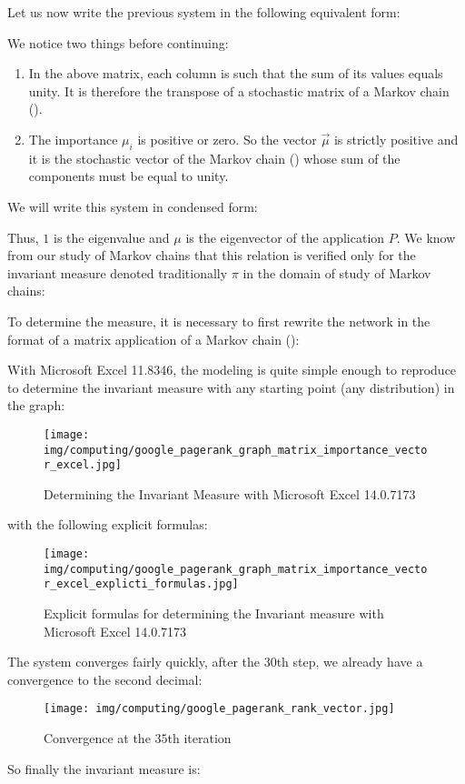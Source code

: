 	Let us now write the previous system in the following equivalent form:
	\setcounter{MaxMatrixCols}{20}
	
	We notice two things before continuing:
	\begin{enumerate}
		\item In the above matrix, each column is such that the sum of its values equals unity. It is therefore the transpose of a stochastic matrix of a Markov chain ().

		\item The importance $\mu_i$ is positive or zero. So the vector $\vec{\mu}$ is strictly positive and it is the stochastic vector of the Markov chain () whose sum of the components must be equal to unity.
	\end{enumerate}
	We will write this system in condensed form:
	
	Thus, $1$ is the eigenvalue and $\mu$ is the eigenvector of the application $P$. We know from our study of Markov chains that this relation is verified only for the invariant measure denoted traditionally $\pi$ in the domain of study of Markov chains:
	
	To determine the measure, it is necessary to first rewrite the network in the format of a matrix application of a Markov chain ():
	
	With Microsoft Excel 11.8346, the modeling is quite simple enough to reproduce to determine the invariant measure with any starting point (any distribution) in the graph:
	\begin{figure}[H]
		\centering
		\texttt{[image: img/computing/google\_pagerank\_graph\_matrix\_importance\_vector\_excel.jpg]}
		\caption[]{Determining the Invariant Measure with Microsoft Excel 14.0.7173}
	\end{figure}
	with the following explicit formulas:
	\begin{figure}[H]
		\centering
		\texttt{[image: img/computing/google\_pagerank\_graph\_matrix\_importance\_vector\_excel\_explicti\_formulas.jpg]}
		\caption[]{Explicit formulas for determining the Invariant measure with Microsoft Excel 14.0.7173}
	\end{figure}
	The system converges fairly quickly, after the $30$th step, we already have a convergence to the second decimal:
	\begin{figure}[H]
		\centering
		\texttt{[image: img/computing/google\_pagerank\_rank\_vector.jpg]}
		\caption[]{Convergence at the $35$th iteration}
	\end{figure}
	So finally the invariant measure is:
	
